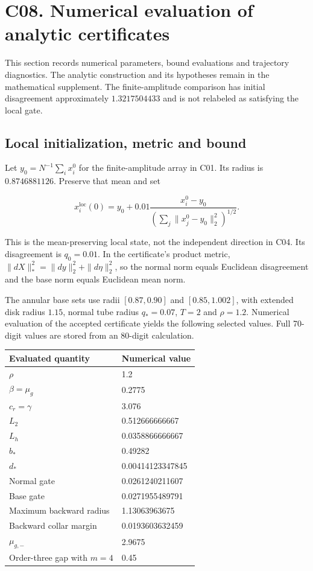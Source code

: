 \documentclass[11pt,a4paper]{article}
\begin{document}
\section{C08. Numerical evaluation of analytic certificates}\label{c08}

This section records numerical parameters, bound evaluations and
trajectory diagnostics. The analytic construction and its hypotheses
remain in the mathematical supplement. The finite-amplitude comparison
has initial disagreement approximately \(1.3217504433\) and is not
relabeled as satisfying the local gate.

\subsection{Local initialization, metric and bound}\label{c08-local}

Let \(y_0=N^{-1}\sum_i x_i^0\) for the finite-amplitude array in C01.
Its radius is \(0.8746881126\). Preserve that mean and set

\[
x_i^{\mathrm{loc}}(0)=y_0+0.01\frac{x_i^0-y_0}{\left(\sum_j\|x_j^0-y_0\|_2^2\right)^{1/2}}.
\]

This is the mean-preserving local state, not the independent direction
in C04. Its disagreement is \(q_0=0.01\). In the certificate's product
metric, \(\|dX\|_*^2=\|dy\|_2^2+\|d\eta\|_2^2\), so the normal norm
equals Euclidean disagreement and the base norm equals Euclidean mean
norm.

The annular base sets use radii \([0.87,0.90]\) and \([0.85,1.002]\),
with extended disk radius \(1.15\), normal tube radius \(q_*=0.07\),
\(T=2\) and \(\rho=1.2\). Numerical evaluation of the accepted
certificate yields the following selected values. Full 70-digit values
are stored from an 80-digit calculation.

\begin{longtable}[]{@{}ll@{}}
\toprule\noalign{}
Evaluated quantity & Numerical value \\
\midrule\noalign{}
\endhead
\bottomrule\noalign{}
\endlastfoot
\(\rho\) & 1.2 \\
\(\beta=\mu_g\) & 0.2775 \\
\(c_r=\gamma\) & 3.076 \\
\(L_2\) & 0.512666666667 \\
\(L_h\) & 0.0358866666667 \\
\(b_*\) & 0.49282 \\
\(d_*\) & 0.00414123347845 \\
Normal gate & 0.0261240211607 \\
Base gate & 0.0271955489791 \\
Maximum backward radius & 1.13063963675 \\
Backward collar margin & 0.0193603632459 \\
\(\mu_{g,-}\) & 2.9675 \\
Order-three gap with \(m=4\) & 0.45 \\
\end{longtable}
\end{document}

